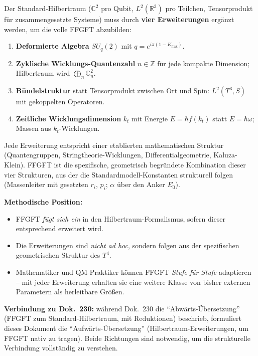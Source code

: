 Der Standard-Hilbertraum ($\mathbb{C}^2$ pro Qubit, $L^2(\mathbb{R}^3)$
pro Teilchen, Tensorprodukt für zusammengesetzte Systeme) muss durch
\textbf{vier Erweiterungen} ergänzt werden, um die volle FFGFT
abzubilden:

\begin{enumerate}[leftmargin=2em,itemsep=2pt,topsep=2pt]
  \item \textbf{Deformierte Algebra} $SU_q(2)$ mit
        $q = e^{i\pi(1-K_{\text{frak}})}$.
  \item \textbf{Zyklische Wicklungs-Quantenzahl} $n \in \mathbb{Z}$ für jede
        kompakte Dimension; Hilbertraum wird
        $\bigoplus_n \mathbb{C}^2_n$.
  \item \textbf{Bündelstruktur} statt Tensorprodukt zwischen Ort und
        Spin: $L^2(T^3, S)$ mit gekoppelten Operatoren.
  \item \textbf{Zeitliche Wicklungsdimension} $k_t$ mit Energie
        $E = \hbar f(k_t)$ statt $E = \hbar\omega$; Massen aus
        $k_t$-Wicklungen.
\end{enumerate}

Jede Erweiterung entspricht einer etablierten mathematischen
Struktur (Quantengruppen, Stringtheorie-Wicklungen, Differentialgeometrie,
Kaluza-Klein). FFGFT ist die spezifische, geometrisch begründete
Kombination dieser vier Strukturen, aus der die
Standardmodell-Konstanten strukturell folgen (Massenleiter mit
gesetzten $r_i$, $p_i$; $\alpha$ über den Anker $E_0$).

\textbf{Methodische Position:}
\begin{itemize}[leftmargin=2em,itemsep=2pt,topsep=2pt]
  \item FFGFT \emph{fügt sich ein} in den Hilbertraum-Formalismus,
        sofern dieser entsprechend erweitert wird.
  \item Die Erweiterungen sind \emph{nicht ad hoc}, sondern folgen
        aus der spezifischen geometrischen Struktur des $T^4$.
  \item Mathematiker und QM-Praktiker können FFGFT \emph{Stufe für
        Stufe} adaptieren -- mit jeder Erweiterung erhalten sie eine
        weitere Klasse von bisher externen Parametern als
        herleitbare Größen.
\end{itemize}

\textbf{Verbindung zu Dok.~230:} während Dok.~230 die
\enquote{Abwärts-Übersetzung} (FFGFT zum Standard-Hilbertraum, mit
Reduktionen) beschrieb, formuliert dieses Dokument die
\enquote{Aufwärts-Übersetzung} (Hilbertraum-Erweiterungen, um FFGFT
nativ zu tragen). Beide Richtungen sind notwendig, um die
strukturelle Verbindung vollständig zu verstehen.
